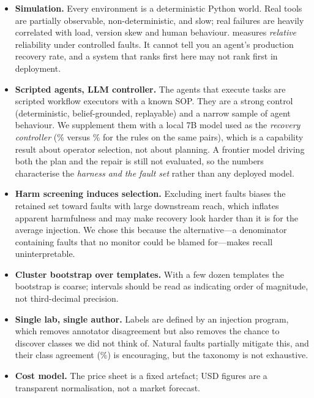 \begin{itemize}
\item \textbf{Simulation.} Every environment is a deterministic Python world. Real tools are
partially observable, non-deterministic, and slow; real failures are heavily correlated with load,
version skew and human behaviour. \arb{} measures \emph{relative} reliability under controlled
faults. It cannot tell you an agent's production recovery rate, and a system that ranks first here
may not rank first in deployment.
\item \textbf{Scripted agents, LLM controller.} The agents that execute tasks are scripted workflow
executors with a known SOP. They are a strong control (deterministic, belief-grounded, replayable) and
a narrow sample of agent behaviour. We supplement them with a local 7B model used as the
\emph{recovery controller} (\LLMRecovery\% versus \LLMRuleRecovery\% for the rules on the same
pairs), which is a capability result about operator selection, not about planning. A frontier model
driving both the plan and the repair is still not evaluated, so the numbers characterise the
\emph{harness and the fault set} rather than any deployed model.
\item \textbf{Harm screening induces selection.} Excluding inert faults biases the retained set
toward faults with large downstream reach, which inflates apparent harmfulness and may make
recovery look harder than it is for the average injection. We chose this because the alternative---a
denominator containing faults that no monitor could be blamed for---makes recall uninterpretable.
\item \textbf{Cluster bootstrap over templates.} With a few dozen templates the bootstrap is
coarse; intervals should be read as indicating order of magnitude, not third-decimal precision.
\item \textbf{Single lab, single author.} Labels are defined by an injection program, which removes
annotator disagreement but also removes the chance to discover classes we did not think of. Natural
faults partially mitigate this, and their class agreement (\NaturalAgreement\%) is encouraging, but
the taxonomy is not exhaustive.
\item \textbf{Cost model.} The price sheet is a fixed artefact; USD figures are a transparent
normalisation, not a market forecast.
\end{itemize}

